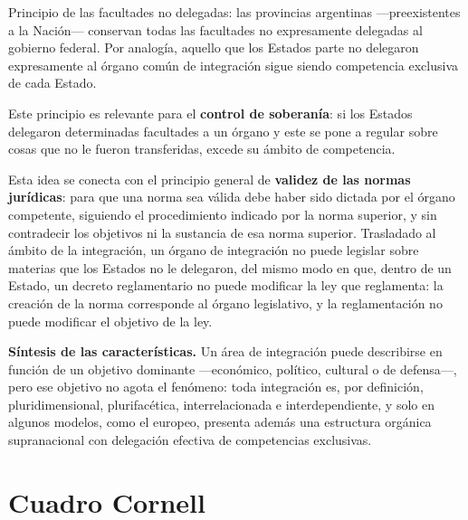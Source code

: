 \documentclass[12pt,oneside]{book}
\newcommand{\cornellsection}{%
    \clearpage
    \section*{Cuadro Cornell}%
    \addcontentsline{toc}{section}{Cuadro Cornell}%
}
\begin{document}
\begin{important}
Principio de las facultades no delegadas: las provincias argentinas —preexistentes a la Nación— conservan todas las facultades no expresamente delegadas al gobierno federal. Por analogía, aquello que los Estados parte no delegaron expresamente al órgano común de integración sigue siendo competencia exclusiva de cada Estado.
\end{important}

Este principio es relevante para el \textbf{control de soberanía}: si los Estados delegaron determinadas facultades a un órgano y este se pone a regular sobre cosas que no le fueron transferidas, excede su ámbito de competencia.

Esta idea se conecta con el principio general de \textbf{validez de las normas jurídicas}: para que una norma sea válida debe haber sido dictada por el órgano competente, siguiendo el procedimiento indicado por la norma superior, y sin contradecir los objetivos ni la sustancia de esa norma superior. Trasladado al ámbito de la integración, un órgano de integración no puede legislar sobre materias que los Estados no le delegaron, del mismo modo en que, dentro de un Estado, un decreto reglamentario no puede modificar la ley que reglamenta: la creación de la norma corresponde al órgano legislativo, y la reglamentación no puede modificar el objetivo de la ley.

\medskip
\textbf{Síntesis de las características.} Un área de integración puede describirse en función de un objetivo dominante —económico, político, cultural o de defensa—, pero ese objetivo no agota el fenómeno: toda integración es, por definición, pluridimensional, plurifacética, interrelacionada e interdependiente, y solo en algunos modelos, como el europeo, presenta además una estructura orgánica supranacional con delegación efectiva de competencias exclusivas.

\cornellsection
\end{document}
